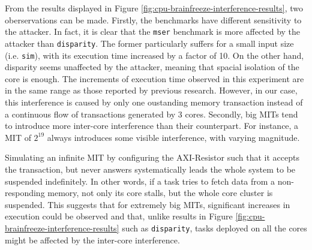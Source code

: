     From the results displayed in Figure \ref{fig:cpu-brainfreeze-interference-results}, two oberservations can be made.
    Firstly, the benchmarks have different sensitivity to the attacker. In fact, it is clear that the \texttt{mser} benchmark is more affected by the attacker than \texttt{disparity}.
    The former particularly suffers for a small input size (i.e. \texttt{sim}), with its execution time increased by a factor of 10.
    On the other hand, disparity seems unaffected by the attacker, meaning that spacial isolation of the core is enough.
    The increments of execution time observed in this experiment are in the same range as those reported by previous research.
    However, in our case, this interference is caused by only one oustanding memory transaction instead of a continuous flow of transactions generated by 3 cores.
    Secondly, big MITs tend to introduce more inter-core interference than their counterpart. For instance, a MIT of $2^{19}$ always introduces some visible interference, with varying magnitude.

    Simulating an infinite MIT by configuring the AXI-Resistor such that it accepts the transaction, but never answers systematically leads the whole system to be suspended indefinitely.
    In other words, if a task tries to fetch data from a non-responding memory, not only its core stalls, but the whole core cluster is suspended.
    This suggests that for extremely big MITs, significant increases in execution could be observed and that, unlike results in Figure \ref{fig:cpu-brainfreeze-interference-results} such as \texttt{disparity}, tasks deployed on all the cores might be affected by the inter-core interference.
